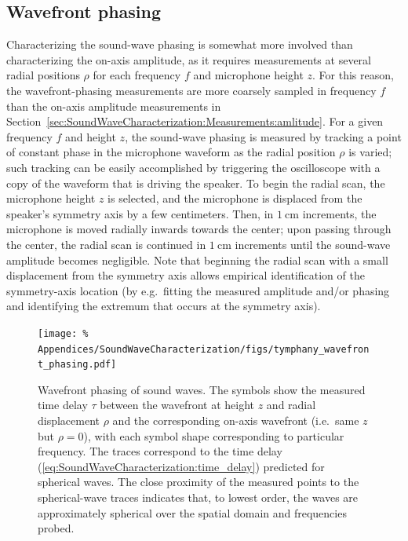 \subsection{Wavefront phasing}
\label{sec:SoundWaveCharacterization:Measurements:phasing}
Characterizing the sound-wave phasing is somewhat more involved
than characterizing the on-axis amplitude,
as it requires measurements at several radial positions $\rho$
for each frequency $f$ and microphone height $z$.
For this reason, the wavefront-phasing measurements
are more coarsely sampled in frequency $f$
than the on-axis amplitude measurements in
Section~\ref{sec:SoundWaveCharacterization:Measurements:amlitude}.
For a given frequency $f$ and height $z$,
the sound-wave phasing is measured by
tracking a point of constant phase in the microphone waveform
as the radial position $\rho$ is varied;
such tracking can be easily accomplished
by triggering the oscilloscope
with a copy of the waveform that is driving the speaker.
To begin the radial scan,
the microphone height $z$ is selected, and
the microphone is displaced from the speaker's symmetry axis
by a few centimeters.
Then, in $\SI{1}{\centi\meter}$ increments,
the microphone is moved radially inwards towards the center;
upon passing through the center,
the radial scan is continued in $\SI{1}{\centi\meter}$ increments
until the sound-wave amplitude becomes negligible.
Note that beginning the radial scan
with a small displacement from the symmetry axis
allows empirical identification of the symmetry-axis location
(by e.g.\ fitting the measured amplitude and/or phasing
and identifying the extremum that occurs at the symmetry axis).

\begin{figure}
  \centering
  \texttt{[image: \%
    Appendices/SoundWaveCharacterization/figs/tymphany\_wavefront\_phasing.pdf]}
  \caption[Wavefront phasing of sound waves]{%
    Wavefront phasing of sound waves.
    The symbols show the measured time delay $\tau$
    between the wavefront at height $z$ and radial displacement $\rho$ and
    the corresponding on-axis wavefront (i.e.\ same $z$ but $\rho = 0$),
    with each symbol shape corresponding to particular frequency.
    The traces correspond to the time delay
    (\ref{eq:SoundWaveCharacterization:time_delay})
    predicted for spherical waves.
    The close proximity of the measured points to the spherical-wave traces
    indicates that, to lowest order, the waves are approximately spherical
    over the spatial domain and frequencies probed.
  }
\label{fig:SoundWaveCharacterization:tymphany_wavefront_phasing}
\end{figure}

